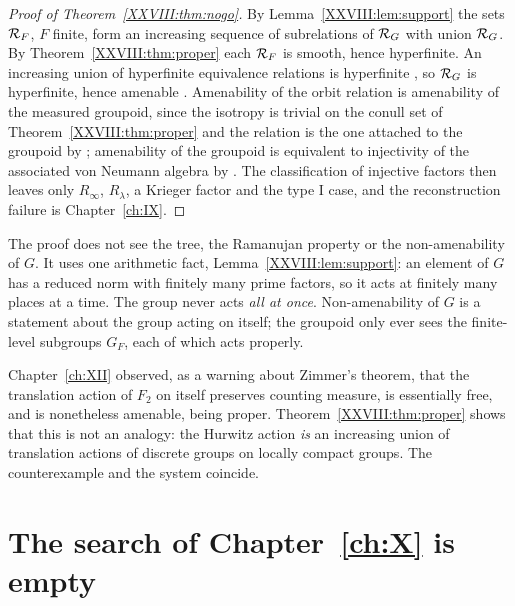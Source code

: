 \begin{proof}[Proof of Theorem~\ref{XXVIII:thm:nogo}]
By Lemma~\ref{XXVIII:lem:support} the sets $\mathcal{R}_F$, $F$ finite, form an increasing sequence of
subrelations of $\mathcal{R}_G$ with union $\mathcal{R}_G$. By Theorem~\ref{XXVIII:thm:proper} each $\mathcal{R}_F$ is smooth,
hence hyperfinite. An increasing union of hyperfinite equivalence relations is hyperfinite
\cite{Dye,CFW}, so $\mathcal{R}_G$ is hyperfinite, hence amenable \cite{Zimmer}. Amenability of the orbit
relation is amenability of the measured groupoid, since the isotropy is trivial on the conull set
of Theorem~\ref{XXVIII:thm:proper} and the relation is the one attached to the groupoid by \cite{FM};
amenability of the groupoid is equivalent to injectivity of the associated von Neumann algebra by
\cite{CFW,ADR}. The classification of injective factors then leaves only
$R_\infty$, $R_\lambda$, a Krieger factor and the type I case, and the reconstruction failure is
Chapter~\ref{ch:IX}.
\end{proof}

\begin{remark}\label{XXVIII:rem:whyno}
The proof does not see the tree, the Ramanujan property or the non-amenability of $G$. It uses one
arithmetic fact, Lemma~\ref{XXVIII:lem:support}: an element of $G$ has a reduced norm with finitely many
prime factors, so it acts at finitely many places at a time. The group never acts \emph{all at
once}. Non-amenability of $G$ is a statement about the group acting on itself; the groupoid only
ever sees the finite-level subgroups $G_F$, each of which acts properly.
\end{remark}

\begin{remark}\label{XXVIII:rem:F2}
Chapter~\ref{ch:XII} observed, as a warning about Zimmer's theorem, that the translation action of $F_2$ on
itself preserves counting measure, is essentially free, and is nonetheless amenable, being proper.
Theorem~\ref{XXVIII:thm:proper} shows that this is not an analogy: the Hurwitz action \emph{is} an
increasing union of translation actions of discrete groups on locally compact groups. The
counterexample and the system coincide.
\end{remark}

\section[The search of Chapter X is empty]{The search of Chapter~\ref{ch:X} is empty}\label{XXVIII:sec:general}

